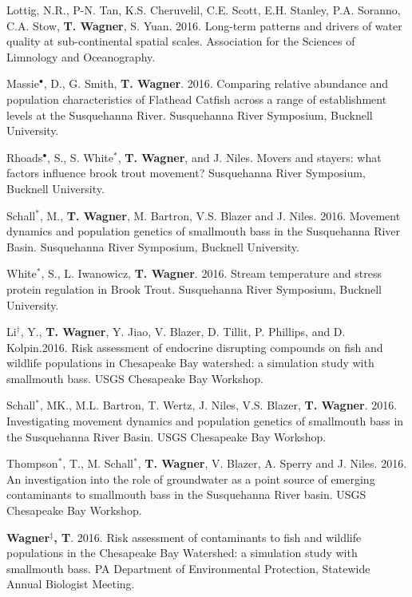 \documentclass[10pt]{article}
\begin{document}
\begin{flushleft}
\begin{etaremune}
\item Lottig, N.R., P-N. Tan, K.S. Cheruvelil, C.E. Scott, E.H. Stanley, P.A. Soranno, C.A. Stow, {\bf T. Wagner}, S. Yuan. 2016. Long-term patterns and drivers of water quality at sub-continental spatial scales. Association for the Sciences of Limnology and Oceanography. 

\item Massie$^\bullet$, D., G. Smith, {\bf T. Wagner}. 2016. Comparing relative abundance and population characteristics of Flathead Catfish across a range of establishment levels at the Susquehanna River. Susquehanna River Symposium, Bucknell University. 

\item Rhoads$^\bullet$, S., S. White$^*$, {\bf T. Wagner}, and J. Niles. Movers and stayers: what factors influence brook trout movement? Susquehanna River Symposium, Bucknell University.

\item Schall$^*$, M., {\bf T. Wagner}, M. Bartron, V.S. Blazer and J. Niles. 2016. Movement dynamics and population genetics of smallmouth bass in the Susquehanna River Basin. Susquehanna River Symposium, Bucknell University.

\item White$^*$, S., L. Iwanowicz, {\bf T. Wagner}. 2016. Stream temperature and stress protein regulation in Brook Trout. Susquehanna River Symposium, Bucknell University. 

\item Li$^\dagger$, Y.,  {\bf T. Wagner}, Y. Jiao, V. Blazer, D. Tillit, P. Phillips, and D. Kolpin.2016. Risk assessment of endocrine disrupting compounds on fish and wildlife populations in Chesapeake Bay watershed: a simulation study with smallmouth bass. USGS Chesapeake Bay Workshop.

\item Schall$^*$, MK., M.L. Bartron, T. Wertz, J. Niles, V.S. Blazer, {\bf T. Wagner}. 2016. Investigating movement dynamics and population genetics of smallmouth bass in the Susquehanna River Basin. USGS Chesapeake Bay Workshop.

Thompson$^*$, T., M. Schall$^*$, {\bf T. Wagner}, V. Blazer, A. Sperry and J. Niles. 2016. An investigation into the role of groundwater as a point source of emerging contaminants to smallmouth bass in the Susquehanna River basin. USGS Chesapeake Bay Workshop.

 \item {\bf Wagner$^\ddagger$, T}. 2016. Risk assessment of contaminants to fish and wildlife populations in the Chesapeake Bay Watershed: a simulation study with smallmouth bass. PA Department of Environmental Protection, Statewide Annual Biologist Meeting.


\end{etaremune}
\end{flushleft}
\end{document}
